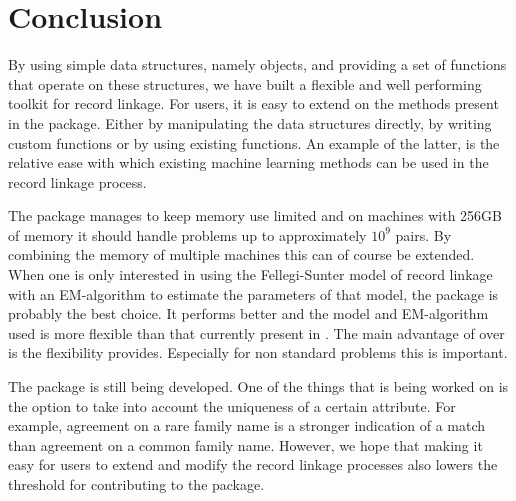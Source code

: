 \section{Conclusion}

By using simple data structures, namely  objects, and providing a set of functions
that operate on these structures, we have built a flexible and well performing toolkit for record
linkage. For users, it is easy to extend on the methods present in the package. Either by
manipulating the data structures directly, by writing custom functions or by using existing
functions. An example of the latter, is the relative ease with which existing machine learning
methods can be used in the record linkage process. 

The package manages to keep memory use limited and on machines with 256GB of memory it should handle
problems up to approximately $10^9$ pairs. By combining the memory of multiple machines this can of
course be extended. When one is only interested in using the Fellegi-Sunter model of record linkage
with an EM-algorithm to estimate the parameters of that model, the  package is
probably the best choice. It performs better and the model and EM-algorithm used is more flexible
than that currently present in . The main advantage of  over
 is the flexibility  provides. Especially for non standard problems this
is important. 

The package is still being developed. One of the things that is being worked on is the option
to take into account the uniqueness of a certain attribute. For example, agreement on a rare family
name is a stronger indication of a match than agreement on a common family name. However, we hope
that making it easy for users to extend and modify the record linkage processes also lowers the
threshold for contributing to the package. 



\address{D. Jan van der Laan\\
  Statistics Netherlands (CBS)\\
  Henri Faasdreef 313, The Hague\\
  The Netherlands\\
  ORCiD: 0000-0002-0693-1514\\
  }

